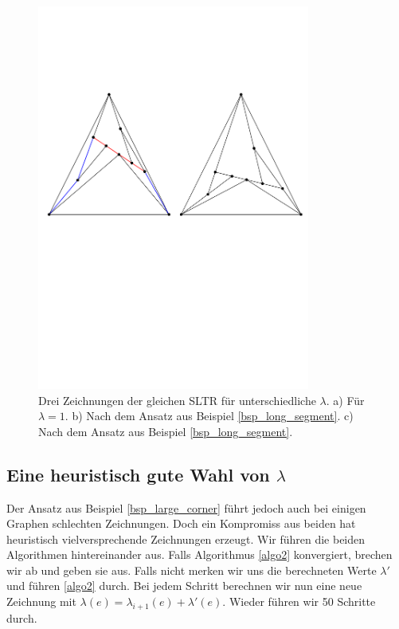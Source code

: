 \begin{figure}[h]
	\centering
  \includegraphics[width=0.8\textwidth]{example1_vis.pdf}
  \caption{Drei Zeichnungen der gleichen SLTR für unterschiedliche $\lambda$. a) Für $\lambda=1$. b) Nach dem Ansatz aus Beispiel \ref{bsp_long_segment}. c) Nach dem Ansatz aus Beispiel \ref{bsp_long_segment}.}
  \label{long_segment}
\end{figure}

\subsection{Eine heuristisch gute Wahl von $\lambda$}

Der Ansatz aus Beispiel \ref{bsp_large_corner} führt jedoch auch bei einigen Graphen schlechten Zeichnungen. Doch ein Kompromiss aus beiden hat heuristisch vielversprechende Zeichnungen erzeugt. Wir führen die beiden Algorithmen hintereinander aus. Falls Algorithmus \ref{algo2} konvergiert, brechen wir ab und geben sie aus. Falls nicht merken wir uns die berechneten Werte $\lambda'$ und führen \ref{algo2} durch. Bei jedem Schritt berechnen wir nun eine neue Zeichnung mit $\lambda(e) = \lambda_{i+1}(e) + \lambda'(e)$. Wieder führen wir 50 Schritte durch. 

